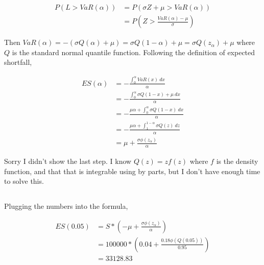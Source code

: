 \documentclass[11pt]{scrartcl}
\begin{document}
\section{}

\subsection{}

\begin{align*}
P(L>VaR(\alpha)) &= P(\sigma Z + \mu > VaR(\alpha)) \\
&= P\left(Z > \frac{VaR(\alpha) - \mu}{\sigma}\right)
\end{align*}

Then $VaR(\alpha) = -(\sigma Q(\alpha) + \mu) = \sigma Q(1-\alpha) + \mu = \sigma Q(z_\alpha) + \mu$ where $Q$ is the standard normal quantile function. Following the definition of expected shortfall,

\begin{align*}
ES(\alpha) &= -\frac{\int_{0}^\alpha VaR(x) \: dx}{\alpha} \\
&= -\frac{\int_{0}^\alpha \sigma Q(1-x) + \mu \: dx}{\alpha} \\
&= -\frac{\mu\alpha + \int_{0}^\alpha \sigma Q(1-x) \: dx}{\alpha} \\
&= -\frac{\mu\alpha + \int_{1}^{1-\alpha} \sigma Q(z) \: dz}{\alpha} \\
&= \mu + \frac{\sigma \phi(z_\alpha)}{\alpha}
\end{align*}

Sorry I didn't show the last step. I know $Q(z) = zf(z)$ where $f$ is the density function, and that that is integrable using by parts, but I don't have enough time to solve this.

\subsection{}

Plugging the numbers into the formula,

\begin{align*}
ES(0.05) &= S * \left(-\mu + \frac{\sigma\phi(z_\alpha)}{\alpha}\right) \\
&= 100000 * \left(0.04 + \frac{0.18\phi(Q(0.05))}{0.95}\right) \\
&= 33128.83
\end{align*}
\end{document}
